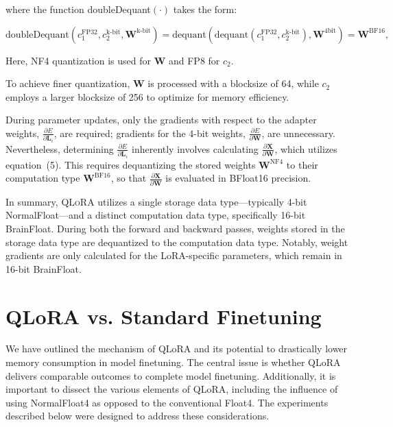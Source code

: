 where the function doubleDequant$(\cdot)$ takes the form:

\begin{equation}
    \text{doubleDequant}(c_1^{\text{FP32}}, c_2^{\text{k-bit}}, \mathbf{W}^{\text{k-bit}}) = \text{dequant}(\text{dequant}(c_1^{\text{FP32}}, c_2^{\text{k-bit}}), \mathbf{W}^{\text{4bit}}) = \mathbf{W}^{\text{BF16}},
\end{equation}

Here, NF4 quantization is used for $\mathbf{W}$ and FP8 for $c_2$.

To achieve finer quantization, $\mathbf{W}$ is processed with a blocksize of 64, while $c_2$ employs a larger blocksize of 256 to optimize for memory efficiency.

During parameter updates, only the gradients with respect to the adapter weights, $\frac{\partial E}{\partial \mathbf{L}_i}$, are required; gradients for the 4-bit weights, $\frac{\partial E}{\partial \mathbf{W}}$, are unnecessary. Nevertheless, determining $\frac{\partial E}{\partial \mathbf{L}_i}$ inherently involves calculating $\frac{\partial \mathbf{X}}{\partial \mathbf{W}}$, which utilizes equation~(5). This requires dequantizing the stored weights $\mathbf{W}^{\text{NF4}}$ to their computation type $\mathbf{W}^{\text{BF16}}$, so that $\frac{\partial \mathbf{X}}{\partial \mathbf{W}}$ is evaluated in BFloat16 precision.

In summary, \textsc{QLoRA} utilizes a single storage data type—typically 4-bit NormalFloat—and a distinct computation data type, specifically 16-bit BrainFloat. During both the forward and backward passes, weights stored in the storage data type are dequantized to the computation data type. Notably, weight gradients are only calculated for the LoRA-specific parameters, which remain in 16-bit BrainFloat.

\section{QLoRA vs. Standard Finetuning}
\label{sec:comp_to_std}

We have outlined the mechanism of QLoRA and its potential to drastically lower memory consumption in model finetuning. The central issue is whether QLoRA delivers comparable outcomes to complete model finetuning. Additionally, it is important to dissect the various elements of QLoRA, including the influence of using NormalFloat4 as opposed to the conventional Float4. The experiments described below were designed to address these considerations.

